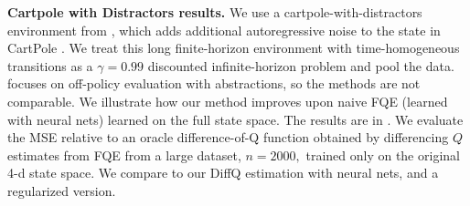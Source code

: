 \documentclass[opre,nonblindrev]{informs4}
\begin{document}
\textbf{Cartpole with Distractors results.} We use a cartpole-with-distractors environment from \citet{hao2024forward}, which adds additional autoregressive noise to the state in CartPole \citep{brockman2016openai}. We treat this long finite-horizon environment with time-homogeneous transitions as a $\gamma=0.99$ discounted infinite-horizon problem and pool the data. \citet{hao2024forward} focuses on off-policy evaluation with abstractions, so the methods are not comparable.
We illustrate how our method improves upon naive FQE (learned with neural nets) learned on the full state space. The results are in . We evaluate the MSE relative to an oracle difference-of-Q function obtained by differencing $Q$ estimates from FQE from a large dataset, $n=2000,$ trained only on the original 4-d state space. We compare to our DiffQ estimation with neural nets, and a regularized version. %

\begin{table}[t!]
\centering
\caption{Performance comparison across different sample sizes in nonlinear settings. Results show MSE ± SE.}
\label{tab:nonlinear_results}
\end{table}
\end{document}
